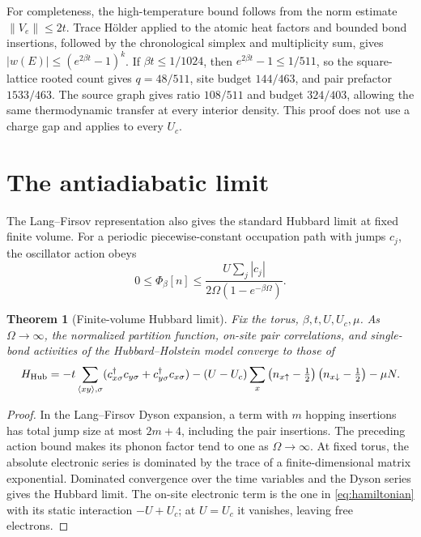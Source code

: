 \documentclass[11pt]{article}
\newtheorem{theorem}{Theorem}
\begin{document}
For completeness, the high-temperature bound follows from the norm estimate $\|V_e\|\le2t$. Trace H\"older applied to the atomic heat factors and bounded bond insertions, followed by the chronological simplex and multiplicity sum, gives $|w(E)|\le(e^{2\beta t}-1)^k$. If $\beta t\le1/1024$, then $e^{2\beta t}-1\le1/511$, so the square-lattice rooted count gives $q=48/511$, site budget $144/463$, and pair prefactor $1533/463$. The source graph gives ratio $108/511$ and budget $324/403$, allowing the same thermodynamic transfer at every interior density. This proof does not use a charge gap and applies to every $U_c$.

\section{The antiadiabatic limit}

The Lang–Firsov representation also gives the standard Hubbard limit at fixed finite volume. For a periodic piecewise-constant occupation path with jumps $c_j$, the oscillator action obeys
\[
 0\le\Phi_\beta[n]\le
 \frac{U\sum_j|c_j|}{2\Omega(1-e^{-\beta\Omega})}.
\]

\begin{theorem}[Finite-volume Hubbard limit]\label{thm:limit}
Fix the torus, $\beta,t,U,U_c,\mu$. As $\Omega\to\infty$, the normalized partition function, on-site pair correlations, and single-bond activities of the Hubbard–Holstein model converge to those of
\[
 H_{\rm Hub}=-t\sum_{\langle xy\rangle,\sigma}
 (c_{x\sigma}^\dagger c_{y\sigma}+c_{y\sigma}^\dagger c_{x\sigma})
 -(U-U_c)\sum_x\left(n_{x\uparrow}-\tfrac12\right)
                   \left(n_{x\downarrow}-\tfrac12\right)-\mu N.
\]
\end{theorem}

\begin{proof}
In the Lang–Firsov Dyson expansion, a term with $m$ hopping insertions has total jump size at most $2m+4$, including the pair insertions. The preceding action bound makes its phonon factor tend to one as $\Omega\to\infty$. At fixed torus, the absolute electronic series is dominated by the trace of a finite-dimensional matrix exponential. Dominated convergence over the time variables and the Dyson series gives the Hubbard limit. The on-site electronic term is the one in \eqref{eq:hamiltonian} with its static interaction $-U+U_c$; at $U=U_c$ it vanishes, leaving free electrons.
\end{proof}
\end{document}
